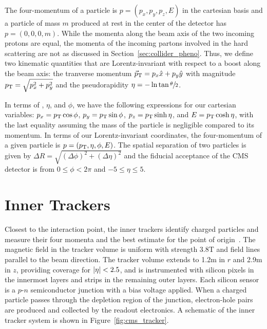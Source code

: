 The four-momentum of a particle is $p = (p_x, p_y, p_z, E)$ in the cartesian basis 
and a particle of mass $m$ produced at rest in the center of the detector has $p = (0, 0, 0, m)$.
While the momenta along the beam axis of the two incoming protons are equal, the momenta of the incoming partons involved in the hard scattering are not as discussed in Section~\ref{sec:collider_pheno}.
Thus, we define two kinematic quantities that are Lorentz-invariant with respect to a boost along the beam axis:
the tranverse momentum ${\vec p}_{\mathrm{T}} = p_x \hat x + p_y \hat y$ with magnitude $p_{\mathrm{T}} = \sqrt{p_x^2 + p_y^2}$ and the pseudorapidity $\eta = - \ln \tan\sfrac{\theta}{2}$.

In terms of \pt, $\eta$, and $\phi$, we have the following expressions for our cartesian variables: $p_x = p_{\mathrm{T}} \cos \phi$, $p_y = p_{\mathrm{T}} \sin \phi$, $p_z = p_{\mathrm{T}} \sinh \eta$, and $E = p_{\mathrm{T}} \cosh \eta$, with the last equality assuming the mass of the particle is negligible compared to its momentum.
In terms of our Lorentz-invariant coordinates, the four-momentum of a given particle is $p = (p_{\mathrm{T}}, \eta, \phi, E)$. 
The spatial separation of two particles is given by $\Delta R = \sqrt{(\Delta\phi)^2 + (\Delta\eta)^2}$ and the fiducial acceptance of the CMS detector is from $0 \le \phi < 2\pi$ and $-5 \le \eta \le 5$.

\section{Inner Trackers}
\label{sec:cms_tracker}

Closest to the interaction point, the inner trackers identify charged particles and measure their four momenta and the best estimate for the point of origin~\cite{CMS2008}.
The magnetic field in the tracker volume is uniform with strength 3.8\unit{T} and field lines parallel to the beam direction. 
The tracker volume extends to 1.2\unit{m} in $r$ and 2.9\unit{m} in $z$, providing coverage for $\lvert \eta \rvert < 2.5$, and is instrumented with silicon pixels in the innermost layers and strips in the remaining outer layers.
Each silicon sensor is a $p$-$n$ semiconductor junction with a bias voltage applied.
When a charged particle passes through the depletion region of the junction, electron-hole pairs are produced and collected by the readout electronics.
A schematic of the inner tracker system is shown in Figure~\ref{fig:cms_tracker}.

